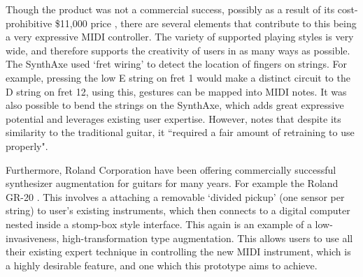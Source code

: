 Though the product was not a commercial success, possibly as a result of its cost-prohibitive \$11,000 price \citep{metlay_musician-machine_1990}, there are several elements that contribute to this being a very expressive MIDI controller. The variety of supported playing styles is very wide, and therefore supports the creativity of users in as many ways as possible. The SynthAxe used `fret wiring' to detect the location of fingers on strings. For example, pressing the low E string on fret 1 would make a distinct circuit to the D string on fret 12, using this, gestures can be mapped into MIDI notes. It was also possible to bend the strings on the SynthAxe, which adds great expressive potential and leverages existing user expertise. However, \cite{metlay_musician-machine_1990} notes that despite its similarity to the traditional guitar, it ``required a fair amount of retraining to use properly". 

Furthermore, Roland Corporation have been offering commercially successful synthesizer augmentation for guitars for many years. For example the Roland GR-20 \citep{roland_roland_2021}. This involves a attaching a removable `divided pickup' (one sensor per string) to user's existing instruments, which then connects to a digital computer nested inside a stomp-box style interface. This again is an example of a low-invasiveness, high-transformation type augmentation. This allows users to use all their existing expert technique in controlling the new MIDI instrument, which is a highly desirable feature, and one which this prototype aims to achieve.  


